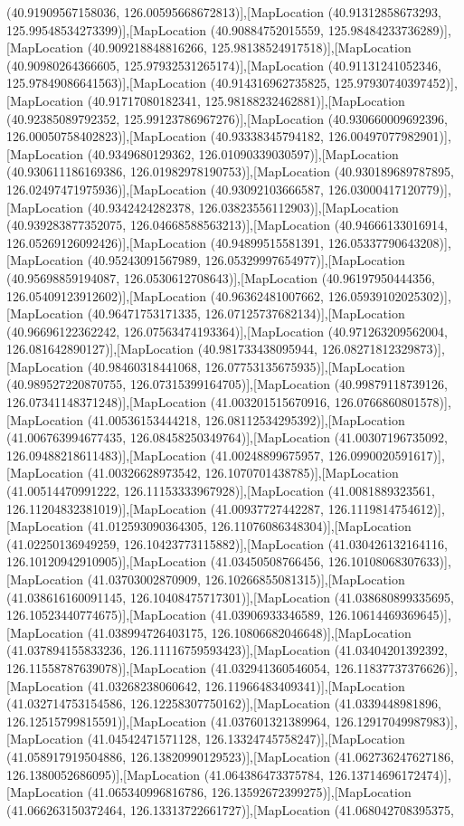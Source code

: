(40.91909567158036, 126.00595668672813)],[MapLocation (40.91312858673293, 125.99548534273399)],[MapLocation (40.90884752015559, 125.98484233736289)],[MapLocation (40.909218848816266, 125.98138524917518)],[MapLocation (40.90980264366605, 125.97932531265174)],[MapLocation (40.91131241052346, 125.97849086641563)],[MapLocation (40.914316962735825, 125.97930740397452)],[MapLocation (40.91717080182341, 125.98188232462881)],[MapLocation (40.92385089792352, 125.99123786967276)],[MapLocation (40.930660009692396, 126.00050758402823)],[MapLocation (40.93338345794182, 126.00497077982901)],[MapLocation (40.9349680129362, 126.01090339030597)],[MapLocation (40.930611186169386, 126.01982978190753)],[MapLocation (40.930189689787895, 126.02497471975936)],[MapLocation (40.93092103666587, 126.03000417120779)],[MapLocation (40.9342424282378, 126.03823556112903)],[MapLocation (40.939283877352075, 126.04668588563213)],[MapLocation (40.94666133016914, 126.05269126092426)],[MapLocation (40.94899515581391, 126.05337790643208)],[MapLocation (40.95243091567989, 126.05329997654977)],[MapLocation (40.95698859194087, 126.0530612708643)],[MapLocation (40.96197950444356, 126.05409123912602)],[MapLocation (40.96362481007662, 126.05939102025302)],[MapLocation (40.96471753171335, 126.07125737682134)],[MapLocation (40.96696122362242, 126.07563474193364)],[MapLocation (40.971263209562004, 126.081642890127)],[MapLocation (40.981733438095944, 126.08271812329873)],[MapLocation (40.98460318441068, 126.07753135675935)],[MapLocation (40.989527220870755, 126.07315399164705)],[MapLocation (40.99879118739126, 126.07341148371248)],[MapLocation (41.003201515670916, 126.0766860801578)],[MapLocation (41.00536153444218, 126.08112534295392)],[MapLocation (41.006763994677435, 126.08458250349764)],[MapLocation (41.00307196735092, 126.09488218611483)],[MapLocation (41.00248899675957, 126.0990020591617)],[MapLocation (41.00326628973542, 126.1070701438785)],[MapLocation (41.00514470991222, 126.11153333967928)],[MapLocation (41.0081889323561, 126.11204832381019)],[MapLocation (41.00937727442287, 126.1119814754612)],[MapLocation (41.012593090364305, 126.11076086348304)],[MapLocation (41.02250136949259, 126.10423773115882)],[MapLocation (41.030426132164116, 126.10120942910905)],[MapLocation (41.03450508766456, 126.10108068307633)],[MapLocation (41.03703002870909, 126.10266855081315)],[MapLocation (41.038616160091145, 126.10408475717301)],[MapLocation (41.038680899335695, 126.10523440774675)],[MapLocation (41.03906933346589, 126.10614469369645)],[MapLocation (41.038994726403175, 126.10806682046648)],[MapLocation (41.037894155833236, 126.11116759593423)],[MapLocation (41.03404201392392, 126.11558787639078)],[MapLocation (41.032941360546054, 126.11837737376626)],[MapLocation (41.03268238060642, 126.11966483409341)],[MapLocation (41.032714753154586, 126.12258307750162)],[MapLocation (41.0339448981896, 126.12515799815591)],[MapLocation (41.037601321389964, 126.12917049987983)],[MapLocation (41.04542471571128, 126.13324745758247)],[MapLocation (41.058917919504886, 126.13820990129523)],[MapLocation (41.062736247627186, 126.1380052686095)],[MapLocation (41.064386473375784, 126.13714696172474)],[MapLocation (41.065340996816786, 126.13592672399275)],[MapLocation (41.066263150372464, 126.13313722661727)],[MapLocation (41.068042708395375, 